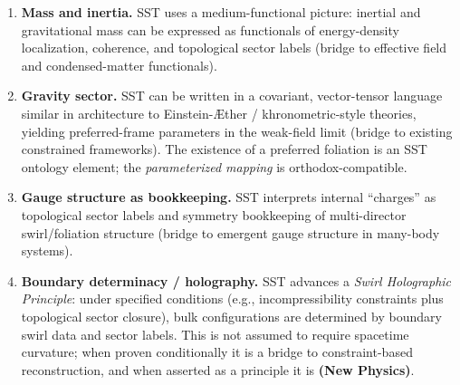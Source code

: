\documentclass[11pt]{article}
\begin{document}
            \begin{enumerate}
                \item \textbf{Mass and inertia.}
                SST uses a medium-functional picture: inertial and gravitational mass can be expressed as functionals of energy-density localization, coherence, and topological sector labels (bridge to effective field and condensed-matter functionals).

                \item \textbf{Gravity sector.}
                SST can be written in a covariant, vector-tensor language similar in architecture to Einstein-\AE ther / khronometric-style theories, yielding preferred-frame parameters in the weak-field limit (bridge to existing constrained frameworks). The existence of a preferred foliation is an SST ontology element; the \emph{parameterized mapping} is orthodox-compatible.

                \item \textbf{Gauge structure as bookkeeping.}
                SST interprets internal ``charges'' as topological sector labels and symmetry bookkeeping of multi-director swirl/foliation structure (bridge to emergent gauge structure in many-body systems).

                \item \textbf{Boundary determinacy / holography.}
                SST advances a \emph{Swirl Holographic Principle}: under specified conditions (e.g., incompressibility constraints plus topological sector closure), bulk configurations are determined by boundary swirl data and sector labels. This is not assumed to require spacetime curvature; when proven conditionally it is a bridge to constraint-based reconstruction, and when asserted as a principle it is \textbf{(New Physics)}.
            \end{enumerate}

\end{document}

